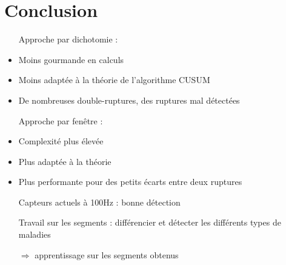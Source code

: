\documentclass{beamer}
\begin{document}

\section{Conclusion}

\begin{frame}

\begin{itemize}

	\item[Approche] par dichotomie :
	\item Moins gourmande en calculs
	\item Moins adaptée à la théorie de l'algorithme CUSUM
	\item De nombreuses double-ruptures, des ruptures mal détectées
	\vspace{.5cm}
	\item[Approche] par fenêtre :
	\item Complexité plus élevée
	\item Plus adaptée à la théorie
	\item Plus performante pour des petits écarts entre deux ruptures
	\vspace{1cm}
	\item[Capteurs] actuels à 100Hz : bonne détection
	\vspace{.5cm}
	\item[Travail] sur les segments : différencier et détecter les différents types de maladies
	\item[$\Longrightarrow$] apprentissage sur les segments obtenus
	\vspace*{1cm}

\end{itemize}

\end{frame}
\end{document}
